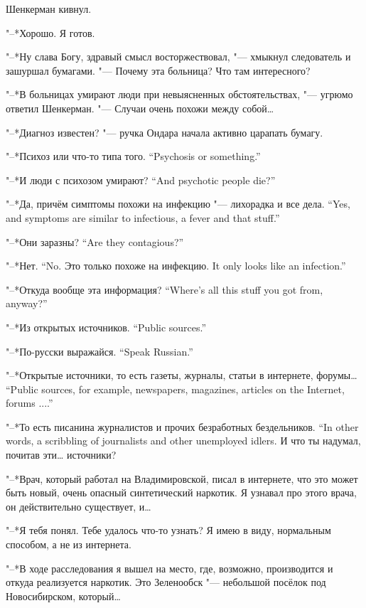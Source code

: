 Шенкерман кивнул.

"--*Хорошо.
Я готов.

"--*Ну слава Богу, здравый смысл восторжествовал, "--- хмыкнул следователь и зашуршал бумагами.
"--- Почему эта больница?
Что там интересного?

"--*В больницах умирают люди при невыясненных обстоятельствах, "--- угрюмо ответил Шенкерман.
"--- Случаи очень похожи между собой\dots{}

"--*Диагноз известен? "--- ручка Ондара начала активно царапать бумагу.

{"--*Психоз или что-то типа того.}
{``Psychosis or something.''}

{"--*И люди с психозом умирают?}
{``And psychotic people die?''}

{"--*Да, причём симптомы похожи на инфекцию "--- лихорадка и все дела.}
{``Yes, and symptoms are similar to infectious, a fever and that stuff.''}

{"--*Они заразны?}
{``Are they contagious?''}

{"--*Нет.}
{``No.}
{Это только похоже на инфекцию.}
{It only looks like an infection.''}

{"--*Откуда вообще эта информация?}
{``Where's all this stuff you got from, anyway?''}

{"--*Из открытых источников.}
{``Public sources.''}

{"--*По-русски выражайся.}
{``Speak Russian.''}

{"--*Открытые источники, то есть газеты, журналы, статьи в интернете, форумы\dots}
{``Public sources, for example, newspapers, magazines, articles on the Internet, forums ....''}

{"--*То есть писанина журналистов и прочих безработных бездельников.}
{``In other words, a scribbling of journalists and other unemployed idlers.}
И что ты надумал, почитав эти\dots{} источники?

"--*Врач, который работал на Владимировской, писал в интернете, что это может быть новый, очень опасный синтетический наркотик.
Я узнавал про этого врача, он действительно существует, и\dots{}

"--*Я тебя понял.
Тебе удалось что-то узнать?
Я имею в виду, нормальным способом, а не из интернета.

"--*В ходе расследования я вышел на место, где, возможно, производится и откуда реализуется наркотик.
Это Зеленообск "--- небольшой посёлок под Новосибирском, который\dots{}

